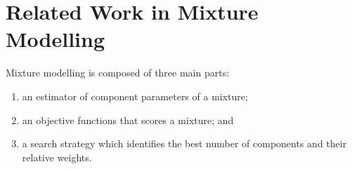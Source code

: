 \documentclass{elsarticle}
\begin{document}

\section{Related Work in Mixture Modelling}

\noindent{}Mixture modelling is composed of three main parts:
\begin{enumerate}
    \item an estimator of component parameters of a mixture;
    \item an objective functions that scores a mixture; and 
    \item a search strategy which identifies the best number of components and
          their relative weights.
\end{enumerate}
\end{document}
